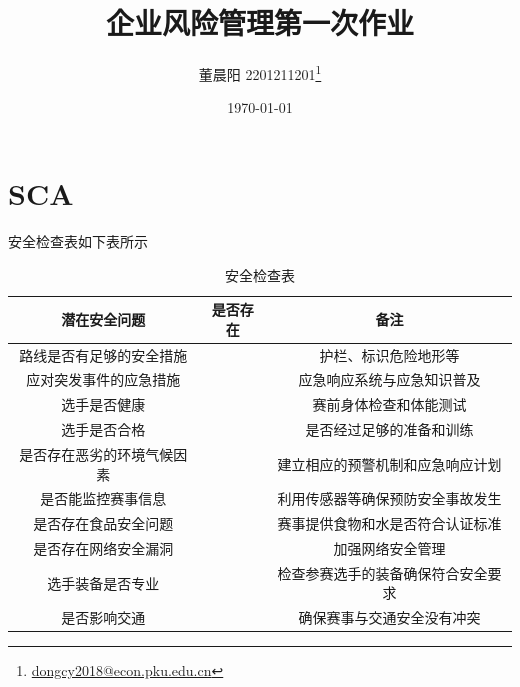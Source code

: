 \documentclass[a4paper,12pt]{ctexart}
\title{企业风险管理第一次作业}
\author{董晨阳 2201211201\thanks{\href{mailto:dongcy2018@econ.pku.edu.cn}{dongcy2018@econ.pku.edu.cn}}}
\date{\today}
\begin{document}
\maketitle
\section{SCA}
安全检查表如下表所示
\begin{table}[H]
    \caption{安全检查表}
    \centering
    \begin{tabular}{ccc}
        \toprule
        潜在安全问题        & 是否存在 & 备注                \\
        \midrule
        路线是否有足够的安全措施  &      & 护栏、标识危险地形等        \\
        应对突发事件的应急措施   &      & 应急响应系统与应急知识普及     \\
        选手是否健康        &      & 赛前身体检查和体能测试       \\
        选手是否合格        &      & 是否经过足够的准备和训练      \\
        是否存在恶劣的环境气候因素 &      & 建立相应的预警机制和应急响应计划  \\
        是否能监控赛事信息     &      & 利用传感器等确保预防安全事故发生  \\
        是否存在食品安全问题    &      & 赛事提供食物和水是否符合认证标准  \\
        是否存在网络安全漏洞    &      & 加强网络安全管理          \\
        选手装备是否专业      &      & 检查参赛选手的装备确保符合安全要求 \\
        是否影响交通        &      & 确保赛事与交通安全没有冲突     \\
        \bottomrule
    \end{tabular}
\end{table}
\end{document}
